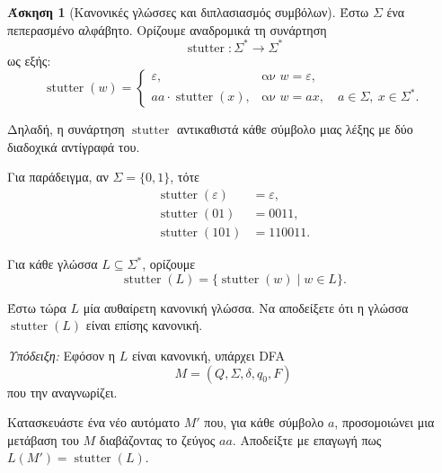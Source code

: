 \documentclass[11pt,a4paper]{article}
\newcommand{\eps}{\varepsilon}
\theoremstyle{definition}
\newtheorem{question}{Άσκηση}
\begin{document}
\begin{question}[Κανονικές γλώσσες και διπλασιασμός συμβόλων]

Έστω $\Sigma$ ένα πεπερασμένο αλφάβητο. Ορίζουμε αναδρομικά τη συνάρτηση
\[
    \operatorname{stutter}:\Sigma^*\to\Sigma^*
\]
ως εξής:
\[
\operatorname{stutter}(w)=
\begin{cases}
\eps,
    & \text{αν } w=\eps,\\[2mm]
aa\cdot\operatorname{stutter}(x),
    & \text{αν } w=ax,
      \quad a\in\Sigma,\ x\in\Sigma^*.
\end{cases}
\]

Δηλαδή, η συνάρτηση $\operatorname{stutter}$
αντικαθιστά κάθε σύμβολο μιας λέξης
με δύο διαδοχικά αντίγραφά του.

Για παράδειγμα, αν $\Sigma=\{0,1\}$, τότε
\[
\begin{aligned}
\operatorname{stutter}(\eps)&=\eps,\\
\operatorname{stutter}(01)&=0011,\\
\operatorname{stutter}(101)&=110011.
\end{aligned}
\]

Για κάθε γλώσσα $L\subseteq\Sigma^*$,
ορίζουμε
\[
    \operatorname{stutter}(L)
    =
    \{\operatorname{stutter}(w)\mid w\in L\}.
\]

Έστω τώρα $L$ μία αυθαίρετη
κανονική γλώσσα. Να αποδείξετε ότι η γλώσσα
$    \operatorname{stutter}(L)$
είναι επίσης κανονική.

\textit{Υπόδειξη:}
Εφόσον η $L$ είναι κανονική,
υπάρχει DFA
\[
    M=(Q,\Sigma,\delta,q_0,F)
\]
που την αναγνωρίζει.

Κατασκευάστε ένα νέο αυτόματο $M'$ που,
για κάθε σύμβολο $a$,
προσομοιώνει μια μετάβαση
του $M$ διαβάζοντας το ζεύγος $aa$. Αποδείξτε με επαγωγή πως $L(M')=\operatorname{stutter}(L)$.
\end{question}
\end{document}
